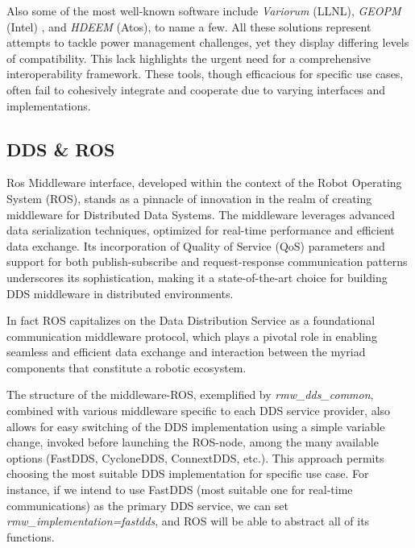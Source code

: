 Also some of the most well-known software include \emph{Variorum} (LLNL), \emph{GEOPM} (Intel) \cite{GEOPM}, and \emph{HDEEM} (Atos)\cite{HDEEM}, to name a few.
All these solutions represent attempts to tackle power management challenges, yet they display differing levels of compatibility. This lack highlights the urgent need for a comprehensive interoperability framework. These tools, though efficacious for specific use cases, often fail to cohesively integrate and cooperate due to varying interfaces and implementations.

\subsection{DDS \& ROS} \label{SSEC:rosiface}

Ros Middleware interface\cite{ros2iface}, developed within the context of the Robot Operating System (ROS), stands as a pinnacle of innovation in the realm of creating middleware for Distributed Data Systems. The middleware leverages advanced data serialization techniques, optimized for real-time performance and efficient data exchange. Its incorporation of Quality of Service (QoS) parameters and support for both publish-subscribe and request-response communication patterns underscores its sophistication, making it a state-of-the-art choice for building DDS middleware in distributed environments.

In fact ROS capitalizes on the Data Distribution Service as a foundational communication middleware protocol\cite{ros2iron}, which plays a pivotal role in enabling seamless and efficient data exchange and interaction between the myriad components that constitute a robotic ecosystem.

The structure of the middleware-ROS, exemplified by \emph{rmw\_dds\_common}\cite{ros2iron}, combined with various middleware specific to each DDS service provider, also allows for easy switching of the DDS implementation using a simple variable change, invoked before launching the ROS-node, among the many available options (FastDDS, CycloneDDS, ConnextDDS, etc.). 
This approach permits choosing the most suitable DDS implementation for specific use case. For instance, if we intend to use FastDDS (most suitable one for real-time communications) as the primary DDS service, we can set \emph{rmw\_implementation=fastdds}, and ROS will be able to abstract all of its functions.

